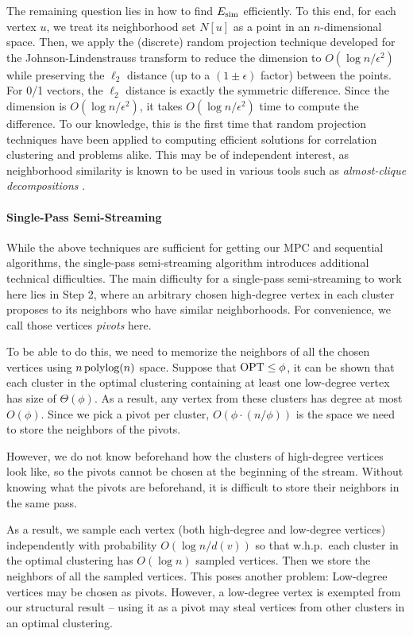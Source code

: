 The remaining question lies in how to find $E_{\operatorname{sim}}$ efficiently. To this end, for each vertex $u$, we treat its neighborhood set $N[u]$ as a point in an $n$-dimensional space. Then, we apply the (discrete) random projection technique \cite{Achlioptas03} developed for the Johnson-Lindenstrauss transform \cite{JL84} to reduce the dimension to $O(\log n / \epsilon^2)$ while preserving the $\ell_2$ distance (up to a $(1 \pm \epsilon)$ factor) between the points. For 0/1 vectors, the $\ell_2$ distance is exactly the symmetric difference. Since the dimension is $O(\log n / \epsilon^2)$, it takes $O(\log n / \epsilon^2)$ time to compute the difference. To our knowledge, this is the first time that random projection techniques have been applied to computing efficient solutions for correlation clustering and problems alike. This may be of independent interest, as neighborhood similarity is known to be used in various tools such as {\it almost-clique decompositions} \cite{HSS18, 
CLP18, HKMT21, HKNT22, FGHKN24, ACK19, FHM23, AKM23, CLMNP21,AW22}.

\paragraph{Single-Pass Semi-Streaming} While the above techniques are sufficient for getting our  MPC and sequential algorithms, the single-pass semi-streaming algorithm introduces additional technical difficulties. The main difficulty for a single-pass semi-streaming to work here lies in Step 2, where an arbitrary chosen high-degree vertex in each cluster proposes to its neighbors who have similar neighborhoods. For convenience, we call those vertices {\it pivots} here. 

To be able to do this, we need to memorize the neighbors of all the chosen vertices using $n \operatorname{\text{{\rm polylog}}} (n)$ space. Suppose that $\mathrm{OPT} \leq \phi$, it can be shown that each cluster in the optimal clustering containing at least one low-degree vertex has size of $\Theta(\phi)$. As a result, any vertex from these clusters has degree at most $O(\phi)$. Since we pick a pivot per cluster, $O(\phi \cdot (n/\phi))$ is the space we need to store the neighbors of the pivots. 

However, we do not know beforehand how the clusters of high-degree vertices look like, so the pivots cannot be chosen at the beginning of the stream. Without knowing what the pivots are beforehand, it is difficult to store their neighbors in the same pass. 

As a result, we sample each vertex (both high-degree and low-degree vertices) independently with probability $O(\log n/ d(v))$ so that w.h.p.~each cluster in the optimal clustering has $O(\log n)$ sampled vertices. Then we store the neighbors of all the sampled vertices. This poses another problem: Low-degree vertices may be chosen as pivots. However, a low-degree vertex is exempted from our structural result -- using it as a pivot may steal vertices from other clusters in an optimal clustering. 

